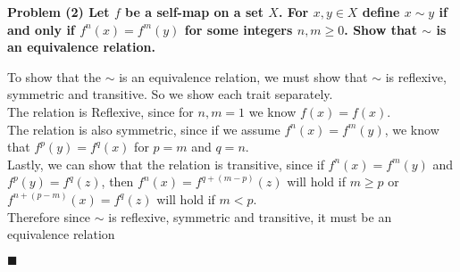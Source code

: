 \documentclass[20pt]{article}
\begin{document}
\noindent
\textbf{Problem (2) Let $f$ be a self-map on a set $X$. For $x, y \in X$ define $x \sim y$ if and only if $f^n(x) = f^m(y)$ for some integers $n, m \geq 0$. Show that $\sim$ is an equivalence relation.}\\
\begin{text}
    \noindent
    To show that the $\sim$ is an equivalence relation, we must show that $\sim$ is reflexive, symmetric and transitive. So we show each trait separately.\\
    
    \noindent
    The relation is Reflexive, since for $n, m = 1$ we know $f(x) = f(x)$.\\
    
    \noindent
    The relation is also symmetric, since if we assume $f^n(x) = f^m(y)$, we know that $f^p(y) = f^q(x)$ for $p = m$ and $q = n$.\\
    
    \noindent
    Lastly, we can show that the relation is transitive, since if $f^n(x) = f^m(y)$ and $f^p(y) = f^q(z)$, then $f^{n}(x) = f^{q + (m - p)}(z)$ will hold if $m \geq p$ or $f^{n + (p - m)}(x) = f^{q}(z)$ will hold if $m < p$.\\
    
    \noindent
    Therefore since $\sim$ is reflexive, symmetric and transitive, it must be an equivalence relation
    
    \hfill $\blacksquare$
\end{text}\\
\end{document}
